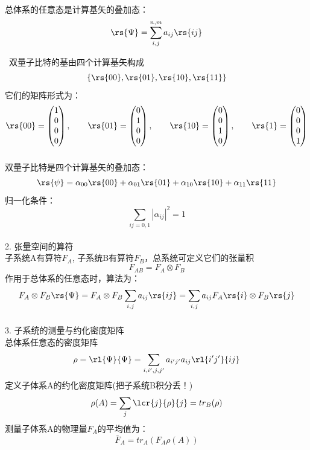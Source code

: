 \begin{frame}
    \frametitle{}
    总体系的任意态是计算基矢的叠加态：
    \[ \rs{\Psi} = \sum_{i,j} ^{n,m} a_{ij}\rs{ij}\] \vspace{0.6em}

    \例[写出双量子比特的计算基]{} 
    \解~双量子比特的基由四个计算基矢构成$$\{\rs{00},\rs{01},\rs{10},\rs{11}\}$$
    它们的矩阵形式为：
    \[
\rs{00} = 
\begin{pmatrix}
    1\\
    0\\
    0\\
    0
\end{pmatrix},\qquad
\rs{01} = 
\begin{pmatrix}
    0\\
    1\\
    0\\
    0
\end{pmatrix},\qquad
\rs{10} = 
\begin{pmatrix}
    0\\
    0\\
    1\\
    0
\end{pmatrix},\qquad
\rs{1} = 
\begin{pmatrix}
    0\\
    0\\
    0\\
    1
\end{pmatrix}
\] 
\end{frame}

\begin{frame}
    \frametitle{}
    双量子比特是四个计算基矢的叠加态：
    \[\rs{\psi} =\alpha_{00}\rs{00}+\alpha_{01}\rs{01}+\alpha_{10}\rs{10}+\alpha_{11}\rs{11}\]
    归一化条件：
    \[ \sum_{ij=0,1} |\alpha_{ij}|^2= 1\]
    ~~\\
    2. 张量空间的算符 \\
    子系统A有算符$F_A$, 子系统B有算符$F_B$，总系统可定义它们的张量积
    \[F_{AB}=F_A \otimes F_B\]
    作用于总体系的任意态时，算法为：
    \[F_A \otimes F_B \rs{\Psi} = F_A \otimes F_B \sum_{i,j} a_{ij}\rs{ij}=  \sum_{i,j} a_{ij}F_A \rs{i}\otimes F_B\rs{j}\]   
\end{frame}

\begin{frame}
    \frametitle{}
    3. 子系统的测量与约化密度矩阵 \\
    总体系任意态的密度矩阵
    \[ \rho=\rl{\Psi} {\Psi}= \sum_{i,i',j,j'} a_{i'j'}a_{ij}\rl{i'j'}{ij}\] 
    定义子体系A的约化密度矩阵(把子系统B积分丢！)
    \[ \rho(A)=\sum_{j}\lcr{j}{\rho}{j}=tr_B(\rho)\] 
    测量子体系A的物理量$F_A$的平均值为：
    \[ \bar{F}_A=tr_A(F_A\rho(A))\] 
    
\end{frame}



